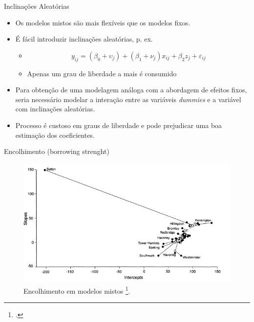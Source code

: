 \documentclass[9pt,ignorenonframetext,aspectratio=169]{beamer}
\providecommand{\tightlist}{%
  \setlength{\itemsep}{0pt}\setlength{\parskip}{0pt}}
\begin{document}
\begin{frame}{Inclinações Aleatórias}

\begin{itemize}[<+->]
\tightlist
\item
  \alert<1>{Os modelos mistos são mais flexíveis que os modelos fixos.}
\item
  \alert<2>{É fácil introduzir inclinações aleatórias, p. ex.}

  \begin{itemize}[<+->]
  \tightlist
  \item
    \alert<3>{\begin{equation}
    y_{ij} = (\beta_0 + \upsilon_j) + (\beta_1 + \nu_j) x_{ij} + \beta_2 z_j + \varepsilon_{ij}
    \end{equation}}
  \item
    \alert<4>{Apenas um grau de liberdade a mais é consumido}
  \end{itemize}
\item
  \alert<5>{Para obtenção de uma modelagem análoga com a abordagem de efeitos fixos, seria necessário modelar a interação entre as variáveis \emph{dummies} e 
  a variável com inclinações aleatórias.}
\item
  \alert<6>{Processo é custoso em graus de liberdade e pode prejudicar uma boa
  estimação dos coeficientes.}
\end{itemize}

\end{frame}

\begin{frame}{Encolhimento (borrowing strenght)}
\protect\hypertarget{encolhimento-borrowing-strenght}{}

\begin{figure}

{\centering \includegraphics[width=0.7\linewidth]{../../images/shrinkage} 

}

\caption{Encolhimento em modelos mistos \footcite{jones1994}.}\label{fig:unnamed-chunk-1}
\end{figure}

\end{frame}
\end{document}
